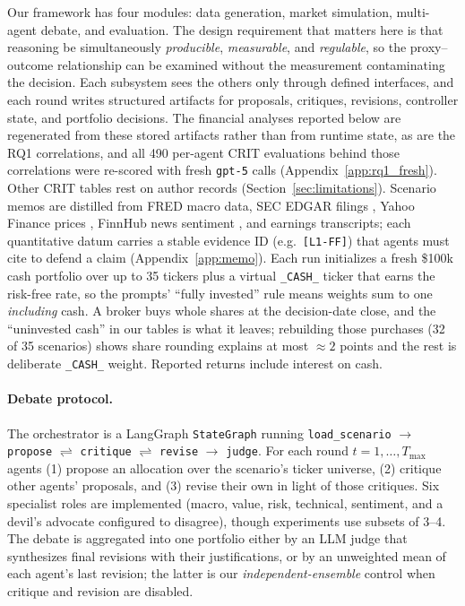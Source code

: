 \documentclass{article}
\begin{document}
Our framework has four modules: data generation, market simulation, multi-agent debate,
and evaluation. The design requirement that matters here is that reasoning be
simultaneously \emph{producible}, \emph{measurable}, and \emph{regulable}, so the
proxy--outcome relationship can be examined without the measurement contaminating the
decision. Each subsystem sees the others only through defined interfaces, and each round writes structured artifacts for proposals, critiques, revisions, controller state, and portfolio decisions. The financial analyses reported below are regenerated from these stored artifacts rather than from runtime state, as are the RQ1 correlations, and all 490 per-agent CRIT evaluations behind those correlations were re-scored with fresh \texttt{gpt-5} calls (Appendix~\ref{app:rq1_fresh}). Other CRIT tables rest on author records (Section~\ref{sec:limitations}).
Scenario memos are distilled from FRED macro data, SEC EDGAR filings
\citep{SEC_EDGAR_API}, Yahoo Finance prices \citep{yahoofinance}, FinnHub news sentiment
\citep{finnhub_api}, and earnings transcripts; each quantitative datum carries a stable
evidence ID (e.g.\ \texttt{[L1-FF]}) that agents must cite to defend a claim
(Appendix~\ref{app:memo}). Each run initializes a fresh \$100k cash portfolio over up to
35 tickers plus a virtual \texttt{\_CASH\_} ticker that earns the risk-free rate, so the
prompts' ``fully invested'' rule means weights sum to one \emph{including} cash. A broker
buys whole shares at the decision-date close, and the ``uninvested cash'' in our tables is
what it leaves; rebuilding those purchases (32 of 35 scenarios) shows share rounding
explains at most ${\approx}2$ points and the rest is deliberate \texttt{\_CASH\_} weight.
Reported returns include interest on cash.

\vspace{-4pt}
\paragraph{Debate protocol.}
The orchestrator is a LangGraph \texttt{StateGraph} \citep{langgraph} running
\texttt{load\_scenario} $\to$ \texttt{propose} $\rightleftharpoons$ \texttt{critique}
$\rightleftharpoons$ \texttt{revise} $\to$ \texttt{judge}. For each round
$t=1,\dots,T_{\max}$ agents (1) propose an allocation over the scenario's ticker
universe, (2) critique other agents' proposals, and (3) revise their own in light of
those critiques. Six specialist roles are implemented (macro, value, risk, technical, sentiment, and a devil's advocate configured to disagree), though experiments use
subsets of 3--4. The debate is aggregated into one portfolio either by an LLM judge that
synthesizes final revisions with their justifications, or by an unweighted mean of each
agent's last revision; the latter is our \emph{independent-ensemble} control when
critique and revision are disabled.
\end{document}
